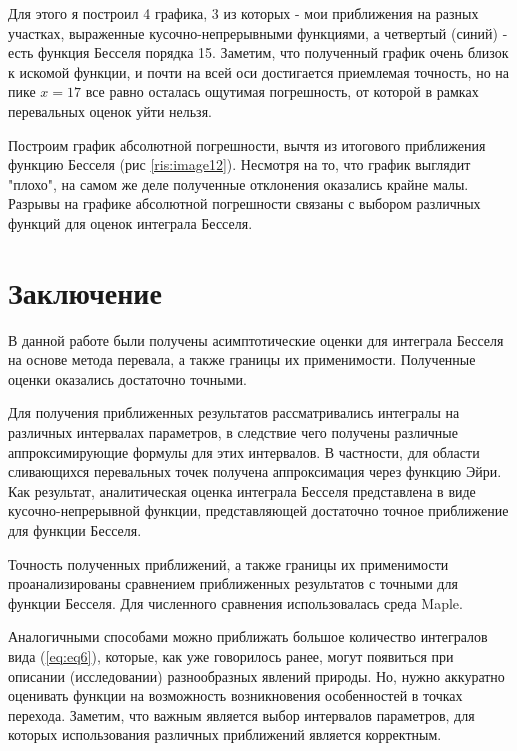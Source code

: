 \documentclass[14pt]{extarticle}
\begin{document}
Для этого я построил 4 графика, 3 из которых - мои приближения на разных участках, выраженные кусочно-непрерывными функциями, а четвертый (синий) - есть функция Бесселя порядка 15. Заметим, что полученный график очень близок к искомой функции, и почти на всей оси достигается приемлемая точность, но на пике $x=17$ все равно осталась ощутимая погрешность, от которой в рамках перевальных оценок уйти нельзя. 

Построим график абсолютной погрешности, вычтя из итогового приближения функцию Бесселя (рис \ref{ris:image12}). Несмотря на то, что график выглядит "плохо", на самом же деле полученные отклонения оказались крайне малы. Разрывы на графике абсолютной погрешности связаны с выбором различных функций для оценок интеграла Бесселя.

\newpage
\section*{Заключение}
  
В данной работе были получены асимптотические оценки для интеграла Бесселя на основе метода перевала, а также границы их применимости. Полученные оценки оказались достаточно точными. 

Для получения приближенных результатов рассматривались интегралы на различных интервалах параметров, 
в следствие чего получены различные аппроксимирующие формулы для этих интервалов. В частности, для области сливающихся перевальных точек получена аппроксимация через функцию Эйри. Как результат, аналитическая оценка интеграла Бесселя представлена в виде кусочно-непрерывной функции, представляющей достаточно точное приближение для функции Бесселя.

Точность полученных приближений, а также границы их применимости проанализированы сравнением приближенных результатов с точными для функции Бесселя. Для численного сравнения использовалась среда Maple.

Аналогичными способами можно приближать большое количество интегралов вида (\ref{eq:eq6}), которые, как уже говорилось ранее, могут появиться при описании (исследовании) разнообразных явлений природы. Но, нужно аккуратно оценивать функции на возможность возникновения особенностей в точках перехода. Заметим, что важным является выбор интервалов параметров, для которых использования различных приближений является корректным. 

 
\newpage
\end{document}
